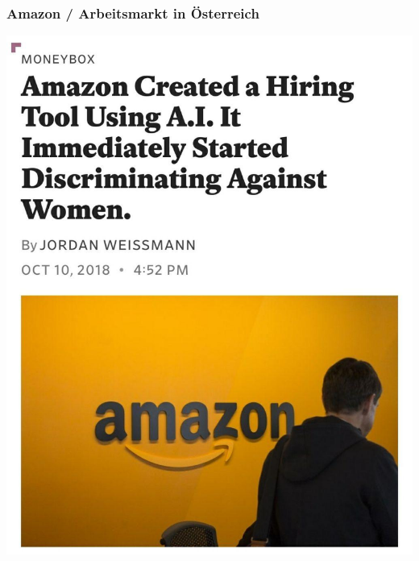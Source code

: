 \documentclass[aspectratio=169,xcolor=dvipsnames]{beamer}
\begin{document}
\begin{frame}
\frametitle{Amazon / Arbeitsmarkt in Österreich}
\begin{center}
\includegraphics[height=0.7\paperheight,keepaspectratio]{images/amazon_hiring} 

\end{center}
\end{frame}
\end{document}
